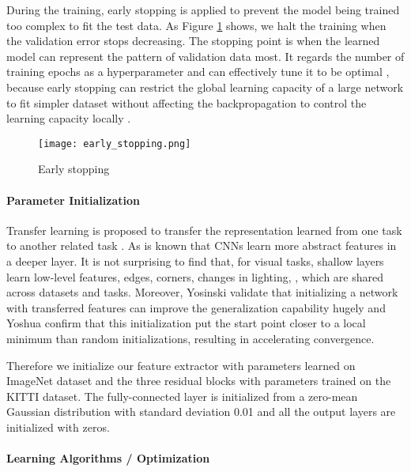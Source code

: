 During the training, early stopping is applied to prevent the model being trained too complex to fit the test data. As Figure \ref{figure:early_stopping} shows, we halt the training when the validation error stops decreasing.  The stopping point is when the learned model can represent the pattern of validation data most. It regards the number of training epochs as a hyperparameter and can effectively tune it to be optimal \cite{DBLP:journals/corr/abs-1206-5533},  because early stopping can restrict the global learning capacity of a large network to fit simpler dataset without affecting the backpropagation to control the learning capacity locally \cite{Caruana:2000:ONN:3008751.3008807}.


\begin{figure}[h]		
	\texttt{[image: early\_stopping.png]}
	\caption{Early stopping}
	\centering
	\label{figure:early_stopping}
\end{figure}

\paragraph{Parameter Initialization}

Transfer learning is proposed to transfer the representation learned from one task to another related task \cite{Pan:2010:STL:1850483.1850545}. As is known that CNNs learn more abstract features in a deeper layer. It is not surprising to find that, for visual tasks, shallow layers learn low-level features, \eg edges, corners, changes in lighting, \etc, which are shared across datasets and tasks. Moreover, Yosinski \etal validate \cite{DBLP:journals/corr/YosinskiCBL14} that initializing a network with transferred features can improve the generalization capability hugely and Yoshua \etal \cite{NIPS2006_3048} confirm that this initialization put the start point closer to a local minimum than random initializations, resulting in accelerating convergence.

Therefore we initialize our feature extractor with parameters learned on ImageNet dataset \cite{DBLP:Russakovsky14} and the three residual blocks with parameters trained on the KITTI dataset. The fully-connected layer is initialized from a zero-mean Gaussian distribution with standard deviation 0.01 and all the output layers are initialized with zeros.


\paragraph{Learning Algorithms / Optimization}













